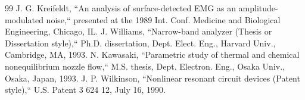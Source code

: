 \documentclass[letterpaper, 10 pt, conference]{ieeeconf}
\begin{document}
\begin{thebibliography}{99}
 J. G. Kreifeldt, ``An analysis of surface-detected EMG as an amplitude-modulated noise,`` presented at the 1989 Int. Conf. Medicine and Biological Engineering, Chicago, IL.
 J. Williams, ``Narrow-band analyzer (Thesis or Dissertation style),`` Ph.D. dissertation, Dept. Elect. Eng., Harvard Univ., Cambridge, MA, 1993. 
 N. Kawasaki, ``Parametric study of thermal and chemical nonequilibrium nozzle flow,`` M.S. thesis, Dept. Electron. Eng., Osaka Univ., Osaka, Japan, 1993.
 J. P. Wilkinson, ``Nonlinear resonant circuit devices (Patent style),`` U.S. Patent 3 624 12, July 16, 1990. 






\end{thebibliography}
\end{document}
